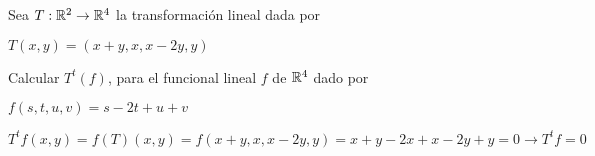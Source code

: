 \item Sea $T:\mathbb{R}^2\to\mathbb{R}^4$ la transformación lineal dada por
    \begin{center}
        $T(x,y)=(x+y,x,x-2y,y)$
    \end{center}
    Calcular $T^t(f)$, para el funcional lineal $f$ de $\mathbb{R}^4$ dado por
    \begin{center}
        $f(s,t,u,v)=s-2t+u+v$
    \end{center}
    \begin{mdframed}[style=s]
        $T^tf(x,y)=f(T)(x,y)=f(x+y,x,x-2y,y)=x+y-2x+x-2y+y=0\to T^tf=0$
    \end{mdframed}